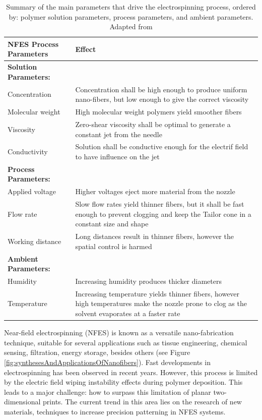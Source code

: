 \begin{table}[ht]
\centering
\caption[Near-Field Electrospinning Process Parameters]{Summary of the main parameters that drive the electrospinning process, ordered by: polymer solution parameters, process parameters, and ambient parameters. Adapted from \cite{Bagbi2019, Unnithan2015}}
\begin{tabularx}{\textwidth}{lX}
\hline
\textbf{NFES Process Parameters} & \textbf{Effect} \\
\hline
\textbf{Solution Parameters:} &  \\
Concentration & Concentration shall be high enough to produce uniform nano-fibers, but low enough to give the correct viscosity \\
Molecular weight & High molecular weight polymers yield smoother fibers \\
Viscosity & Zero-shear viscosity shall be optimal to generate a constant jet from the needle \\
Conductivity & Solution shall be conductive enough for the electrif field to have influence on the jet \\
\textbf{Process Parameters:} &  \\
Applied voltage & Higher voltages eject more material from the nozzle \\
Flow rate & Slow flow rates yield thinner fibers, but it shall be fast enough to prevent clogging and keep the Tailor cone in a constant size and shape \\
Working distance & Long distances result in thinner fibers, however the spatial control is harmed \\
\textbf{Ambient Parameters:} &  \\
Humidity & Increasing humidity produces thicker diameters \\
Temperature & Increasing temperature yields thinner fibers, however high temperatures make the nozzle prone to clog as the solvent evaporates at a faster rate \\
\hline
\end{tabularx}
\label{tab:nfesProcessParameters}
\end{table}

Near-field electrospinning (NFES) is known as a versatile nano-fabrication technique, suitable for several applications such as tissue engineering, chemical sensing, filtration, energy storage, besides others (see Figure \ref{fig:synthesesAndApplicationsOfNanofibers}). Fast developments in electrospinning has been observed in recent years. However, this process is limited by the electric field wiping instability effects during polymer deposition. This leads to a major challenge: how to surpass this limitation of planar two-dimensional prints. The current trend in this area lies on the research of new materials, techniques to increase precision patterning in NFES systems.

